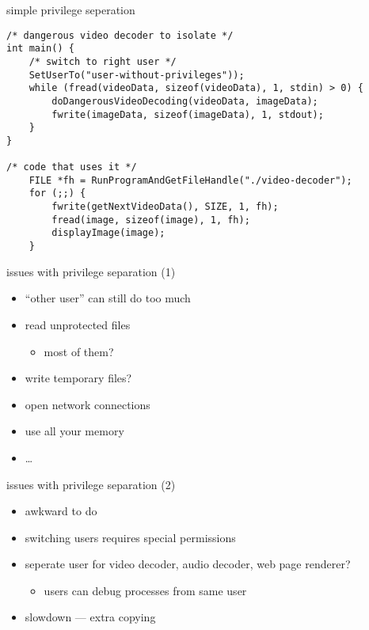 \begin{frame}[fragile,label=privSepOutline]{simple privilege seperation}
    \vspace{-.5cm}
\begin{verbatim}
/* dangerous video decoder to isolate */
int main() {
    /* switch to right user */
    SetUserTo("user-without-privileges"));
    while (fread(videoData, sizeof(videoData), 1, stdin) > 0) {
        doDangerousVideoDecoding(videoData, imageData);
        fwrite(imageData, sizeof(imageData), 1, stdout);
    }
}

/* code that uses it */
    FILE *fh = RunProgramAndGetFileHandle("./video-decoder");
    for (;;) {
        fwrite(getNextVideoData(), SIZE, 1, fh);
        fread(image, sizeof(image), 1, fh);
        displayImage(image);
    }
\end{verbatim}
\end{frame}

\begin{frame}{issues with privilege separation (1)}
    \begin{itemize}
    \item ``other user'' can still do too much
    \vspace{.5cm}
    \item read unprotected files
        \begin{itemize}
        \item most of them?
        \end{itemize}
    \item write temporary files?
    \item open network connections
    \item use all your memory
    \item \ldots
    \end{itemize}
\end{frame}

\begin{frame}{issues with privilege separation (2)}
    \begin{itemize}
    \item awkward to do
    \item switching users requires special permissions
    \item seperate user for  video decoder, audio decoder, web page renderer?
        \begin{itemize}
        \item users can debug processes from same user
        \end{itemize}
    \item slowdown --- extra copying
    \end{itemize}
\end{frame}

